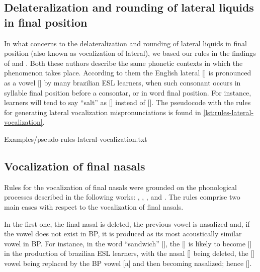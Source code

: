 \subsection{Delateralization and rounding of lateral liquids in final position}
In what concerns to the delateralization and rounding of lateral liquids in final position (also known as vocalization of lateral), we based
our rules in the findings of \citeauthor{Baratieri2006} \citep{Baratieri2006} and \citeauthor{Moore2008} \citep{Moore2008}. Both these authors
describe the same phonetic contexts in which the phenomenon takes place. According to them the English lateral [] is
pronounced as a vowel [] by many brazilian \ac{ESL} learners, when such consonant occurs in syllable final position before
a consontar, or in word final position. For instance, learners will tend to say ``salt'' as [] instead of [].
The pseudocode with the rules for generating lateral vocalization mispronunciations is found in \autoref{lst:rules-lateral-vocalization}.

%
    {Examples/pseudo-rules-lateral-vocalization.txt}

\subsection{Vocalization of final nasals}

Rules for the vocalization of final nasals were grounded on the phonological processes described in the following works:
\citeauthor{Kluge2007} \citep{Kluge2007}, \citeauthor{Kluge2008} \citep{Kluge2008}, \citeauthor{Kluge2012} \citep{Kluge2012}, 
\citeauthor{Silveira2007} \citep{Silveira2007} and \citeauthor{Silveira2012} \citep{Silveira2012}.
The rules comprise two main cases with respect to the vocalization of final nasals. 

In the first one, the
final nasal is deleted, the previous vowel is nasalized and, if the vowel does not exist in \ac{BP}, it is produced as its
most acoustically similar vowel in \ac{BP}. For instance, in the word ``sandwich'' [],
the  [] is likely
to become [] in the production of brazilian \ac{ESL} learners, with the nasal [] being deleted, the 
[\textipa{\ae}] vowel being replaced by the \ac{BP} vowel [a] and then becoming nasalized; hence []. 

